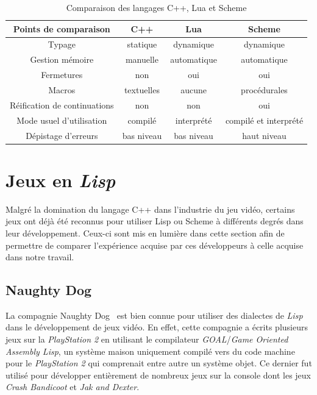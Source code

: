 \documentclass[12pt,oneside,letterpaper,francais]{book}
\newcommand{\lisp}{{\textit{Lisp }}}
\begin{document}
\begin{table}
\begin{tabular}{cccc}
Points de comparaison         & C++ & Lua & Scheme\\
\hline \hline
Typage                       & statique & dynamique & dynamique\\
Gestion mémoire              & manuelle & automatique & automatique\\
Fermetures                   & non & oui & oui\\
Macros                       & textuelles & aucune & procédurales\\
Réification de continuations & non & non & oui\\
Mode usuel d'utilisation     & compilé & interprété & compilé et interprété\\
Dépistage d'erreurs          & bas niveau & bas niveau & haut niveau\\
\hline
\end{tabular}
\caption{Comparaison des langages C++, Lua et Scheme}
\label{Rev:lang-comp}
\end{table}

\section{Jeux en \lisp}

Malgré la domination du langage C++ dans l'industrie du jeu vidéo,
certains jeux ont déjà été reconnus pour utiliser Lisp ou Scheme à
différents degrés dans leur développement. Ceux-ci sont mis en lumière
dans cette section afin de permettre de comparer l'expérience acquise
par ces développeurs à celle acquise dans notre travail.


\subsection{Naughty Dog}


La compagnie Naughty Dog~\cite{ND} est bien connue pour utiliser des
dialectes de \lisp dans le développement de jeux vidéo. En effet,
cette compagnie a écrits plusieurs jeux sur la \textit{PlayStation 2}
en utilisant le compilateur \textit{GOAL}/\textit{Game Oriented
  Assembly Lisp}, un système maison uniquement compilé vers du code
machine pour le \textit{PlayStation 2} qui comprenait entre autre un
système objet. Ce dernier fut utilisé pour développer entièrement de
nombreux jeux sur la console dont les jeux \textit{Crash Bandicoot} et
\textit{Jak and Dexter}.
\end{document}
